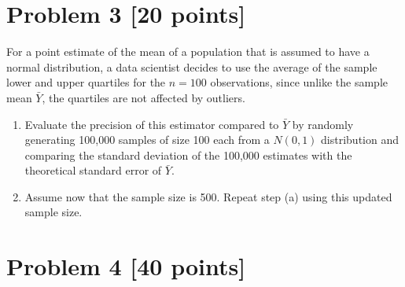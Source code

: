 \documentclass[12pt]{article}
\begin{document}
\section*{Problem 3 [20 points]}

For a point estimate of the mean of a population that is assumed to have a normal distribution, a data scientist decides to use the average of the sample lower and upper quartiles for the $n=100$ observations, since unlike the sample mean $\bar{Y}$, the quartiles are not affected by outliers.

\begin{enumerate}
\item[(a)] Evaluate the precision of this estimator compared to $\bar{Y}$ by randomly generating 100,000 samples of size 100 each from a $N(0,1)$ distribution and comparing the standard deviation of the 100,000 estimates with the theoretical standard error of $\bar{Y}$.

\item[(b)] Assume now that the sample size is 500. Repeat step (a) using this updated sample size.
\end{enumerate}

\section*{Problem 4 [40 points]}
\end{document}
